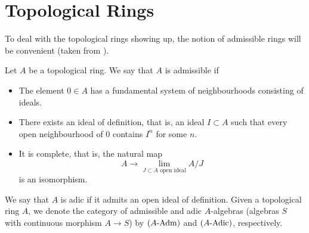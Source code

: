 \documentclass[../main.tex]{subfiles}
\begin{document}
\section{Topological Rings}
To deal with the topological rings showing up, the notion of admissible rings
will be convenient (taken from \cite[Tag 07E8]{stacks-project}).
\begin{defi}\label{def:admring}
  Let $A$ be a topological ring. We say that $A$ is admissible if
  \begin{itemize}
    \item The element $0 \in A$ has a fundamental system of neighbourhoods
      consisting of ideals.
    \item There exists an ideal of definition, that is, an ideal $I \subset A$ such
      that every open neighbourhood of $0$ contains $I^n$ for some $n$.
    \item It is complete, that is, the natural map
      \begin{equation*}
        A \to \lim_{J \subset A \text{ open ideal}} A/J
      \end{equation*}
      is an isomorphism.
  \end{itemize}
  We say that $A$ is adic if it admits an open ideal of definition.
  Given a topological ring $A$, we denote the category of admissible 
  and adic $A$-algebras (algebras $S$ with continuous morphism $A \to S$) by
  ${({A}\text-\mathrm{Adm})}$ and ${({A}\text-\mathrm{Adic})}$, respectively.
\end{defi}
\end{document}
